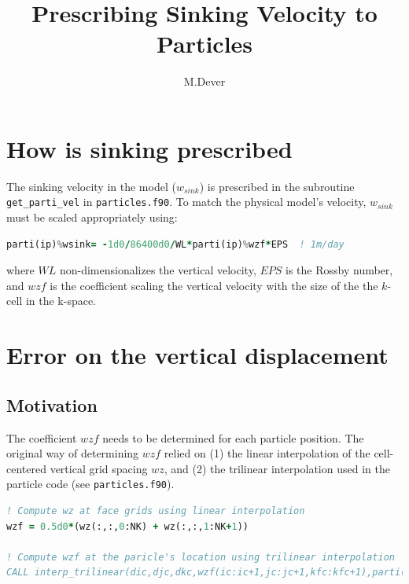 \documentclass[]{article}
\title{Prescribing Sinking Velocity to Particles}
\author{M.Dever}
\begin{document}
\maketitle
\large

\section*{How is sinking prescribed}
\justifying
\raggedright

The sinking velocity in the model ($w_{sink}$) is prescribed in the subroutine \texttt{get\_parti\_vel} in \texttt{particles.f90}. To match the physical model's velocity, $w_{sink}$ must be scaled appropriately using:
\begin{lstlisting}[language=fortran]
parti(ip)%wsink= -1d0/86400d0/WL*parti(ip)%wzf*EPS  ! 1m/day
\end{lstlisting}

where $WL$ non-dimensionalizes the vertical velocity, $EPS$ is the Rossby number, and $wzf$ is the coefficient scaling the vertical velocity with the size of the the $k$-cell in the k-space.

\section*{Error on the vertical displacement }
\justifying
\subsection*{Motivation}
The coefficient $wzf$ needs to be determined for each particle position. The original way of determining $wzf$ relied on (1) the linear interpolation of the cell-centered vertical grid spacing $wz$, and (2) the trilinear interpolation used in the particle code (see \texttt{particles.f90}).

\begin{lstlisting}[language=fortran]
! Compute wz at face grids using linear interpolation
wzf = 0.5d0*(wz(:,:,0:NK) + wz(:,:,1:NK+1))

! Compute wzf at the paricle's location using trilinear interpolation
CALL interp_trilinear(dic,djc,dkc,wzf(ic:ic+1,jc:jc+1,kfc:kfc+1),parti(ip)%wzf)
\end{lstlisting}
\end{document}
